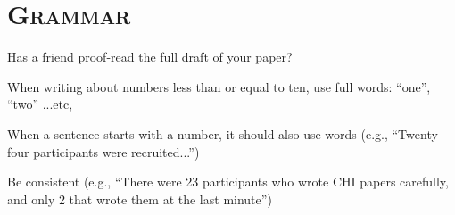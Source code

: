 	



\newpage
\section*{\textsc{Grammar}}

\begin{checklist}
	\item Has a friend proof-read the full draft of your paper? 
	\item When writing about numbers less than or equal to ten, use full words: ``one'', ``two'' ...etc, 
	\item When a sentence starts with a number, it should also use words (e.g., ``Twenty-four participants were recruited...'') 
	\item Be consistent (e.g., ``There were 23 participants who wrote CHI papers carefully, and only 2 that wrote them at the last minute'')
\end{checklist}



\noindent\makebox[\linewidth]{\rule{\linewidth}{0.4pt}}
